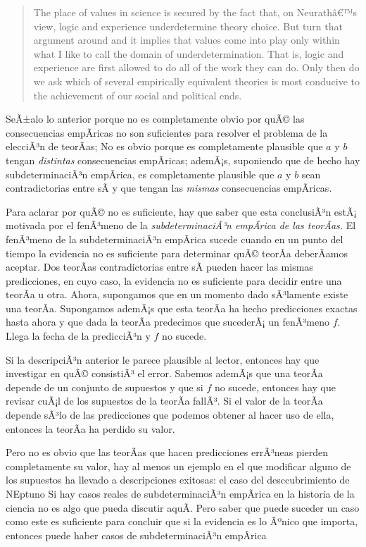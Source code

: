 \begin{quote}
	The place of values in science is secured by the fact that, on Neurathâ€™s view, logic and experience underdetermine theory choice.
	But turn that argument around and it implies that values come into play only within what I like to call the domain of underdetermination. 
	That is, logic and experience are first allowed to do all of the work they can do. 
	Only then do we ask which of several empirically equivalent theories is most conducive to the achievement of our social and political ends. \parencite[p.~10]{Howard2006}
\end{quote}

SeÃ±alo lo anterior porque no es completamente obvio por quÃ© las consecuencias empÃ­ricas no son suficientes para resolver el problema de la elecciÃ³n de teorÃ­as;
No es obvio porque es completamente plausible que $a$ y $b$ tengan \emph{distintas} consecuencias empÃ­ricas;
ademÃ¡s, suponiendo que de hecho hay subdeterminaciÃ³n empÃ­rica, es completamente plausible que $a$ y $b$ sean contradictorias entre sÃ­ y que tengan las \emph{mismas} consecuencias empÃ­ricas.

Para aclarar por quÃ© no es suficiente, hay que saber que esta conclusiÃ³n estÃ¡ motivada por el fenÃ³meno de la \emph{subdeterminaciÃ³n empÃ­rica de las teorÃ­as.}
El fenÃ³meno de la subdeterminaciÃ³n empÃ­rica sucede cuando en un punto del tiempo la evidencia no es suficiente para determinar quÃ© teorÃ­a deberÃ­amos aceptar.
Dos teorÃ­as contradictorias entre sÃ­ pueden hacer las mismas predicciones, en cuyo caso, la evidencia no es suficiente para decidir entre una teorÃ­a u otra.
Ahora, supongamos que en un momento dado sÃ³lamente existe una teorÃ­a.
Supongamos ademÃ¡s que esta teorÃ­a ha hecho predicciones exactas hasta ahora y que dada la teorÃ­a predecimos que sucederÃ¡ un fenÃ³meno $f$.
Llega la fecha de la predicciÃ³n y $f$ no sucede.

Si la descripciÃ³n anterior le parece plausible al lector, entonces hay que investigar en quÃ© consistiÃ³ el error.
Sabemos ademÃ¡s que una teorÃ­a depende de un conjunto de supuestos y que si $f$ no sucede, entonces hay que revisar cuÃ¡l de los supuestos de la teorÃ­a fallÃ³.
Si el valor de la teorÃ­a depende sÃ³lo de las predicciones que podemos obtener al hacer uso de ella, entonces la teorÃ­a ha perdido su valor.

Pero no es obvio que las teorÃ­as que hacen predicciones errÃ³neas pierden completamente su valor, hay al menos un ejemplo en el que modificar alguno de los supuestos ha llevado a descripciones exitosas: el caso del desccubrimiento de NEptuno  
Si hay casos reales de subdeterminaciÃ³n empÃ­rica en la historia de la ciencia no es algo que pueda discutir aquÃ­.
Pero saber que puede suceder un caso como este es suficiente para concluir que si la evidencia es lo Ãºnico que importa, entonces puede haber casos de subdeterminaciÃ³n empÃ­rica 



